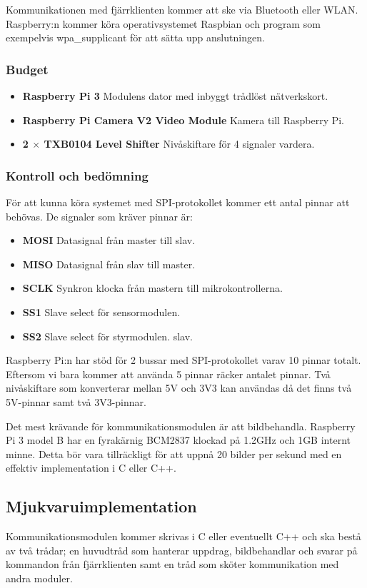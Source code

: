 \documentclass[designspec/spec.tex]{subfiles}
\begin{document}
Kommunikationen med fjärrklienten kommer att ske via Bluetooth eller WLAN.
Raspberry:n kommer köra operativsystemet Raspbian och program som exempelvis
wpa\_supplicant för att sätta upp anslutningen.

\subsubsection{Budget}
\begin{itemize}
    \item \textbf{Raspberry Pi 3} Modulens dator med inbyggt trådlöst
    nätverkskort.
    \item \textbf{Raspberry Pi Camera V2 Video Module} Kamera till Raspberry
    Pi.
    \item \textbf{2 $\times$ TXB0104 Level Shifter} Nivåskiftare för 4 signaler
    vardera.
\end{itemize}

\subsubsection{Kontroll och bedömning}
För att kunna köra systemet med SPI-protokollet kommer ett antal pinnar att
behövas. De signaler som kräver pinnar är:
\begin{itemize}
    \item \textbf{MOSI} Datasignal från master till slav.
    \item \textbf{MISO} Datasignal från slav till master.
    \item \textbf{SCLK} Synkron klocka från mastern till mikrokontrollerna.
    \item \textbf{SS1} Slave select för sensormodulen.
    \item \textbf{SS2} Slave select för styrmodulen.
    slav.
\end{itemize}

Raspberry Pi:n har stöd för 2 bussar med SPI-protokollet varav 10 pinnar
totalt. Eftersom vi bara kommer att använda 5 pinnar räcker antalet pinnar.
Två nivåskiftare som konverterar mellan 5V och 3V3 kan användas då det finns
två 5V-pinnar samt två 3V3-pinnar.

Det mest krävande för kommunikationsmodulen är att bildbehandla.  Raspberry Pi
3 model B har en fyrakärnig BCM2837 klockad på 1.2GHz och 1GB internt minne.
Detta bör vara tillräckligt för att uppnå 20 bilder per sekund med en effektiv
implementation i C eller C++.

\subsection{Mjukvaruimplementation}
Kommunikationsmodulen kommer skrivas i C eller eventuellt C++ och ska bestå av
två trådar; en huvudtråd som hanterar uppdrag, bildbehandlar och svarar på
kommandon från fjärrklienten samt en tråd som sköter kommunikation med andra
moduler.
\end{document}
